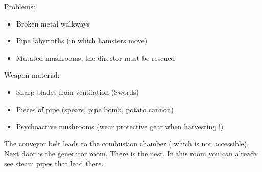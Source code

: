 Problems:
\begin{itemize}
\item Broken metal walkways
\item Pipe labyrinths (in which hamsters move)
\item Mutated mushrooms, the director must be rescued 
\end{itemize}

Weapon material:

\begin{itemize}
\item Sharp blades from ventilation (Swords)
\item Pieces of pipe (spears, pipe bomb, potato cannon)
\item Psychoactive mushrooms (wear protective gear when harvesting !)
\end{itemize}


The conveyor belt leads to the combustion chamber ( which is not accessible). Next door is the generator room. There is the nest.
In this room you can already see steam pipes that lead there.

